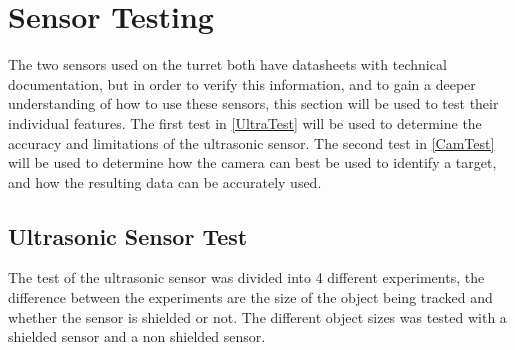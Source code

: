 \section{Sensor Testing}\label{SensorTest}
The two sensors used on the turret both have datasheets with technical
documentation, but in order to verify this information, and to gain a
deeper understanding of how to use these sensors, this section will be used to
test their individual features. The first test in \autoref{UltraTest} will be
used to determine the accuracy and limitations of the ultrasonic sensor. The second
test in \autoref{CamTest} will be used to determine how the camera can best be
used to identify a target, and how the resulting data can be accurately used. 

% 
 


\subsection{Ultrasonic Sensor Test}\label{UltraTest}
The test of the ultrasonic sensor was divided into 4 different experiments, the
difference between the experiments are the size of the object being tracked and
whether the sensor is shielded or not. The different object sizes was tested
with a shielded sensor and a non shielded sensor. \nl

